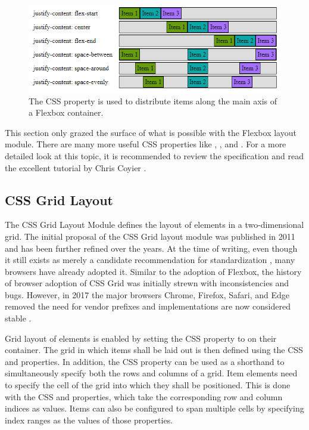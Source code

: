 \begin{figure}[tp]
\centering
\includegraphics[keepaspectratio,width=\linewidth,height=\thirdh]
{images/flexbox-justify-content.png}
\caption[Flexbox CSS  Property]{
The CSS  property is used to distribute
items along the main axis of a Flexbox container. 
}
\label{fig:FlexboxJustifyContent}
\end{figure}


This section only grazed the surface of what is possible with the
Flexbox layout module. There are many more useful CSS properties like
, , and .
For a more detailed look at this topic, it is recommended to review
the specification \parencite{CSSFlexbox} and read the excellent
tutorial by Chris Coyier \parencite{Coyier-FlexboxGuide}.





\subsection{CSS Grid Layout}
\label{sec:Grid}

The CSS Grid Layout Module \parencite{CSSGrid} defines the layout of
elements in a two-dimensional grid. The initial proposal of the CSS
Grid layout module was published in 2011 \parencite{CSSGridFirstDraft}
and has been further refined over the years. At the time of writing,
even though it still exists as merely a candidate recommendation for
standardization \parencite{CSSGrid}, many browsers have already
adopted it. Similar to the adoption of Flexbox, the history of browser
adoption of CSS Grid was initially strewn with inconsistencies and
bugs. However, in 2017 the major browsers Chrome, Firefox, Safari, and
Edge removed the need for vendor prefixes and implementations are now
considered stable \parencite{CanIUseCSSGrid}.

Grid layout of elements is enabled by setting the CSS
 property to  on their container. The grid
in which items shall be laid out is then defined using the CSS
 and 
properties. In addition, the CSS  property can
be used as a shorthand to simultaneously specify both the rows and
columns of a grid.
%
Item elements need to specify the cell of the grid into which they
shall be positioned. This is done with the CSS  and
 properties, which take the corresponding row and
column indices as values. Items can also be configured to span
multiple cells by specifying index ranges as the values of those
properties.

